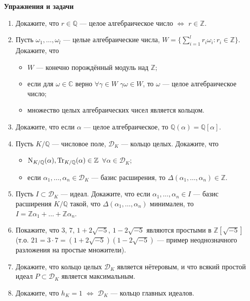 \noindent\textbf{Упражнения и задачи}
\begin{enumerate}[topsep=0pt]
    \item Докажите, что $r\in\mathbb{Q}$ --- целое алгебраическое число $\iff$ $r\in\mathbb{Z}$. %
    \item Пусть $\omega_1, \dots, \omega_l$ --- целые алгебраические числа, $W = \{\sum_{i=1}^l r_i \omega_i: r_i\in\mathbb{Z}\}$. Докажите, что
    \begin{itemize}[noitemsep,topsep=0pt]
        \item $W$ --- конечно порождённый модуль над $\mathbb{Z}$;
        \item если для $\omega\in\mathbb{C}$ верно $\forall\gamma\in W$ $\gamma\omega\in W$, то $\omega$ --- целое алгебраическое число;
        \item множество целых алгебраических чисел является кольцом.
    \end{itemize} %
    \item Докажите, что если $\alpha$ --- целое алгебраическое, то $\mathbb{Q}(\alpha)=\mathbb{Q}[\alpha]$. %
    \item Пусть $K/\mathbb{Q}$ --- числовое поле, $\mathcal{D}_K$ --- кольцо целых. Докажите, что 
    \begin{itemize}[noitemsep,topsep=0pt]
        \item $\operatorname{N}_{K/\mathbb{Q}}(\alpha),\operatorname{Tr}_{K/\mathbb{Q}}(\alpha)\in\mathbb{Z}$ $\forall\alpha\in\mathcal{D}_K$;
        \item если $\alpha_1,\dots,\alpha_n \in \mathcal{D}_K$ --- базис расширения, то $\Delta(\alpha_1,\dots,\alpha_n)\in\mathbb{Z}$.
    \end{itemize} %
    \item Пусть $I\subset\mathcal{D}_K$ --- идеал. Докажите, что если $\alpha_1,\dots,\alpha_n \in I$ --- базис расширения $K/\mathbb{Q}$ такой, что $\Delta(\alpha_1,\dots,\alpha_n)$ минимален, то $I = \mathbb{Z}\alpha_1 + \dots + \mathbb{Z}\alpha_n$. %
    \item Покажите, что $3$, $7$, $1+2\sqrt{-5}$, $1-2\sqrt{-5}$ являются простыми в $\mathbb{Z}[\sqrt{-5}]$ (т.о. $21 = 3\cdot 7 = (1+2\sqrt{-5})(1-2\sqrt{-5})$ --- пример неоднозначного разложения на простые множители).
    \item Докажите, что кольцо целых $\mathcal{D}_K$ является нётеровым, и что всякий простой идеал $P \subset\mathcal{D}_K$ является максимальным. %
    \item Докажите, что $h_K = 1$ $\iff$ $\mathcal{D}_K$ --- кольцо главных идеалов. %

\end{enumerate}
